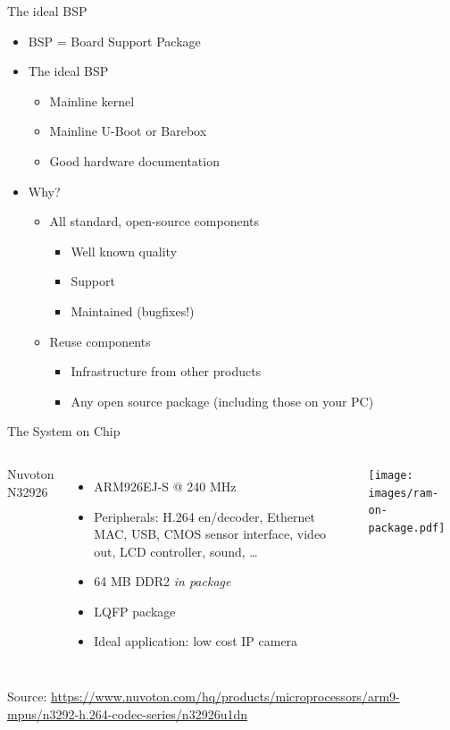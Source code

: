 \documentclass[xetex,table,aspectratio=169]{beamer}
\begin{document}
\begin{frame}{The ideal BSP}
  \begin{itemize}
  \item BSP = Board Support Package
  \item The ideal BSP
    \begin{itemize}
    \item Mainline kernel
    \item Mainline U-Boot or Barebox
    \item Good hardware documentation
    \end{itemize}
  \item Why?
    \begin{itemize}
    \item All standard, open-source components
      \begin{itemize}
      \item Well known quality
      \item Support
      \item Maintained (bugfixes!)
      \end{itemize}
    \item Reuse components
      \begin{itemize}
      \item Infrastructure from other products
      \item Any open source package (including those on your PC)
      \end{itemize}
    \end{itemize}
  \end{itemize}
\end{frame}

\begin{frame}{The System on Chip}
  \begin{columns}
    Nuvoton N32926
    \begin{itemize}
    \item ARM926EJ-S @ 240 MHz
    \item Peripherals: H.264 en/decoder, Ethernet MAC, USB, CMOS
      sensor interface, video out, LCD controller, sound, \dots
    \item 64 MB DDR2 {\em in package}
    \item LQFP package
    \item Ideal application: low cost IP camera
    \end{itemize}

    \texttt{[image: images/ram-on-package.pdf]}
  \end{columns}

  {\tiny Source:
    \url{https://www.nuvoton.com/hq/products/microprocessors/arm9-mpus/n3292-h.264-codec-series/n32926u1dn}}
\end{frame}
\end{document}
